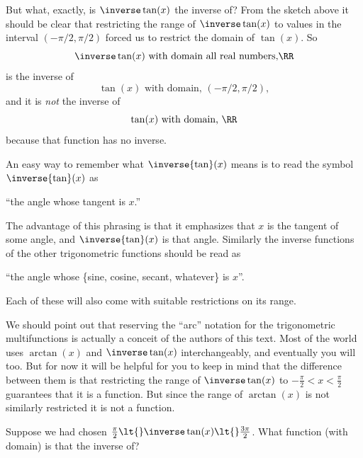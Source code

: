 But what, exactly, is $\inverse\tan(x)$ the inverse of? From the sketch above it
should be clear that restricting the \alert{range} of
$\inverse\tan(x)$ to values in the interval $(-\pi/2, \pi/2)$ forced
us to restrict the \alert{domain} of $\tan(x)$. So
$$
\inverse\tan(x) \text{ with domain all real numbers,} \RR
$$
is the inverse of
$$
\tan(x) \text{ with domain, } (-\pi/2, \pi/2),
$$
and it is \emph{not} the inverse of
$$
\tan(x) \text{ with domain, } \RR
$$
because that function  has no inverse.


An easy way to remember what $\inverse{\tan}(x)$ means is to read the
symbol $\inverse{\tan}(x)$ as\\
\centerline{``the angle whose tangent is $x$.''}
The
advantage of this phrasing is that it emphasizes that $x$ is the
tangent of some angle, and $\inverse{\tan}(x)$ is that
angle. Similarly the inverse functions of the other trigonometric
functions should be
read as\\
\centerline{``the angle whose \{sine, cosine, secant, whatever\} is
  $x$''.}  Each of these will also come with suitable restrictions on
its range.

We should point out that reserving the ``arc'' notation for the
trigonometric multifunctions is actually a conceit of the authors of
this text. Most of the world uses $\arctan(x)$ and $\inverse\tan(x)$
interchangeably, and eventually you will too. But for now it will be
helpful for you to keep in mind that the difference between them is
that restricting the range  of   $\inverse\tan(x)$  to
$-\frac{\pi}{2}\lt x\lt\frac{\pi}{2}$ guarantees that it is a
function. But since the range of   $\arctan(x)$ is not similarly
restricted it is not
a function.


\begin{ProficiencyDrill}
  Suppose we had chosen
  $\frac{\pi}{2}\lt{}\inverse\tan(x)\lt{}\frac{3\pi}{2}$. What function (with
  domain) is that the inverse of?
\end{ProficiencyDrill}




